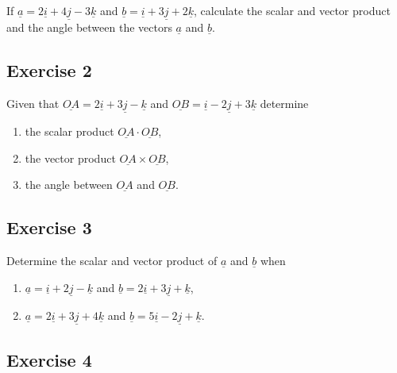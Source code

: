 \documentclass[
  11pt,
  oneside]{book}
\providecommand{\tightlist}{%
  \setlength{\itemsep}{0pt}\setlength{\parskip}{0pt}}
\newcommand{\slide}{}
\theoremstyle{definition}
\theoremstyle{definition}
\theoremstyle{definition}
\theoremstyle{definition}
\theoremstyle{remark}
\begin{document}
If \(\underline{a} = 2\underline{i} + 4\underline{j} - 3\underline{k}\) and \(\underline{b} = \underline{i} + 3\underline{j} + 2\underline{k}\), calculate the scalar and vector product and the angle between the vectors \(\underline{a}\) and \(\underline{b}\).

\slide

\subsection*{Exercise 2}\label{exercise-2-14}

Given that \(\underline{OA} = 2\underline{i} + 3\underline{j} - \underline{k}\) and \(\underline{OB} = \underline{i} - 2\underline{j} + 3\underline{k}\) determine

\begin{enumerate}
\def\labelenumi{\arabic{enumi}.}
\tightlist
\item
  the scalar product \(\underline{OA}\cdot\underline{OB}\),
\item
  the vector product \(\underline{OA}\times\underline{OB}\),
\item
  the angle between \(\underline{OA}\) and \(\underline{OB}\).
\end{enumerate}

\slide

\subsection*{Exercise 3}\label{exercise-3-12}

Determine the scalar and vector product of \(\underline{a}\) and \(\underline{b}\) when

\begin{enumerate}
\def\labelenumi{\arabic{enumi}.}
\tightlist
\item
  \(\underline{a} = \underline{i} + 2\underline{j} - \underline{k}\) and \(\underline{b} = 2\underline{i} + 3\underline{j} + \underline{k}\),
\item
  \(\underline{a} = 2\underline{i} + 3\underline{j} + 4\underline{k}\) and \(\underline{b} = 5\underline{i} - 2\underline{j} + \underline{k}\).
\end{enumerate}

\slide

\subsection*{Exercise 4}\label{exercise-4-10}
\end{document}
